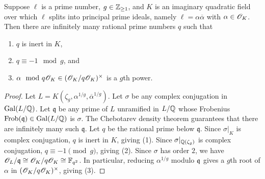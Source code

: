 \documentclass{amsart}
\begin{document}
\begin{lemma}\label{lem:K-exists}
  Suppose $\ell$ is a prime number, %
  $g \in\mathbb{Z}_{\ge 1}$, and $K$ is an imaginary quadratic field over which $\ell$ splits into principal prime ideals, namely $\ell = \alpha\overline{\alpha}$ with $\alpha\in \mathscr{O}_K$.
Then there are infinitely many rational prime numbers $q$ such that
    \begin{enumerate}
      \item $q$ is inert in $K$,
      \item $q \equiv -1 \mod{g}$, and
      \item $\alpha \mod q\mathscr{O}_K \in (\mathscr{O}_K/q\mathscr{O}_K)^\times$ is a $g$th power.
    \end{enumerate}
\end{lemma}
\begin{proof}
  Let $L = K(\zeta_g,\alpha^{1/g},\overline{\alpha}^{1/g})$.
  Let $\sigma$ be any complex conjugation in $\operatorname{Gal}(L/\mathbb{Q})$.
  Let $\mathfrak{q}$ be any prime of $L$ unramified in $L/\mathbb{Q}$ whose Frobenius $\mathrm{Frob}(\mathfrak{q}) \in \operatorname{Gal}(L/\mathbb{Q})$ is $\sigma$. The Chebotarev density theorem guarantees that there are infinitely many such $\mathfrak{q}$.
  Let $q$ be the rational prime below $\mathfrak{q}$.
  Since $\sigma|_K$ is complex conjugation, $q$ is inert in $K$, giving (1).
  Since $\sigma|_{\mathbb{Q}(\zeta_g)}$ is complex conjugation, $q \equiv -1 \pmod{g}$, giving (2).
Since $\sigma$ has order $2$, we have $\mathscr{O}_L/\mathfrak{q} \cong \mathscr{O}_K/q\mathscr{O}_K \cong \mathbb{F}_{q^2}$. In particular, reducing $\alpha^{1/g}$
modulo ${\frak q}$ gives a $g$th root of $\alpha$
 in $(\mathscr{O}_K/q\mathscr{O}_K)^\times$, giving (3).
\end{proof}
\end{document}
